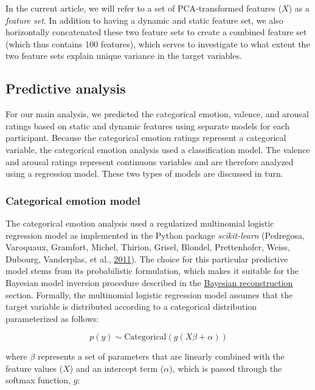 \documentclass[11pt,american,]{memoir} %
\begin{document}
In the current article, we will refer to a set of PCA-transformed features (\(X\)) as a \emph{feature set}. In addition to having a dynamic and static feature set, we also horizontally concatenated these two feature sets to create a combined feature set (which thus contains 100 features), which serves to investigate to what extent the two feature sets explain unique variance in the target variables.

\hypertarget{svsd-pred-analysis}{%
\subsection{Predictive analysis}\label{svsd-pred-analysis}}

For our main analysis, we predicted the categorical emotion, valence, and arousal ratings based on static and dynamic features using separate models for each participant. Because the categorical emotion ratings represent a categorical variable, the categorical emotion analysis used a classification model. The valence and arousal ratings represent continuous variables and are therefore analyzed using a regression model. These two types of models are discussed in turn.

\hypertarget{svsd-cat-emo}{%
\subsubsection{Categorical emotion model}\label{svsd-cat-emo}}

The categorical emotion analysis used a regularized multinomial logistic regression model as implemented in the Python package \emph{scikit-learn} (Pedregosa, Varoquaux, Gramfort, Michel, Thirion, Grisel, Blondel, Prettenhofer, Weiss, Dubourg, Vanderplas, et al., \protect\hyperlink{ref-Pedregosa2011-bp}{2011}). The choice for this particular predictive model stems from its probabilistic formulation, which makes it suitable for the Bayesian model inversion procedure described in the \protect\hyperlink{svsd-bayes}{Bayesian reconstruction} section. Formally, the multinomial logistic regression model assumes that the target variable is distributed according to a categorical distribution parameterized as follows:

\begin{equation}
p(y) \sim \mathrm{Categorical}(g(X\beta + \alpha))
\end{equation}

where \(\beta\) represents a set of parameters that are linearly combined with the feature values (\(X\)) and an intercept term (\(\alpha\)), which is passed through the softmax function, \(g\):
\end{document}
